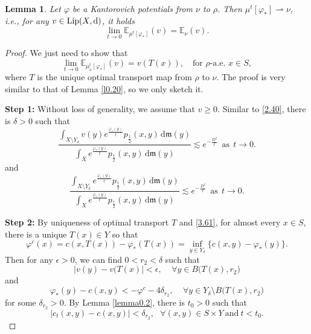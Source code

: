 \documentclass[a4paper,11pt]{article}
\numberwithin{equation}{section}
\theoremstyle{plain}
\newtheorem{lemma}[theorem]{Lemma}
\theoremstyle{definition}
\theoremstyle{remark}
\newcommand{\mm}{\mathfrak m}
\newcommand{\E}{\mathbb{E}}
\newcommand{\Lip}{\mathop{\rm Lip}\nolimits}
\renewcommand{\d}{{\mathrm d}}
\newcommand{\weakto}{\rightharpoonup}
\begin{document}
	\begin{lemma}\label{l0.21}
		Let $\varphi$ be a Kantorovich potentials from $\nu$ to $\rho$.   Then $\mu^t[\varphi_{*}]\weakto \nu$,   i.e.,  for any  $v\in\Lip(X,\d)$, it holds
		\begin{equation}
			\lim_{t\rightarrow0}\E_{\mu^t[\varphi_{*}]}(v)=\E_\nu(v).
		\end{equation}
	\end{lemma}
     \begin{proof}
     		We just need to show that 
     	\begin{equation}\label{0.38}
     		\lim_{t\rightarrow0}\E_{\mu_x^t[\varphi_{*}]}(v)=v(T(x)),\quad\text{for $\rho$-a.e. $x\in S$},
     	\end{equation}
     	where $T$ is the unique optimal transport map from $\rho$ to $\nu$.  The proof is very similar to that of Lemma \ref{l0.20}, so we only sketch it.
          \medskip
          
     	{\bf Step 1:}   Without loss of generality,  we assume that $v\geq 0$.  Similar to \eqref{2.40},  there is $\delta>0$ such that 
     	\begin{equation}\label{ext1}
     	\frac{\int_{X\setminus Y_\delta} v(y) e^{\frac{\varphi_*(y)}{t}}p_\frac{t}{2}(x,y)\,\d\mm(y)}{\int_X e^{\frac{\varphi_*(y)}{t}}p_\frac{t}{2}(x,y)\,\d\mm(y)}\lesssim  e^{-\frac{D^2}{t}} ~~\text{as}~~t\to 0.
     	\end{equation}
     	and
     	\begin{equation}\label{2.53}
     	\frac{\int_{X\setminus Y_\delta} e^{\frac{\varphi_*(y)}{t}}p_\frac{t}{2}(x,y)\,\d\mm(y)}{\int_X e^{\frac{\varphi_*(y)}{t}}p_\frac{t}{2}(x,y)\,\d\mm(y)}\lesssim  e^{-\frac{D^2}{t}} ~~\text{as}~~t\to 0.
     	\end{equation}
     	
     
     	{\bf Step 2:} By uniqueness of optimal transport $T$ and \eqref{3.61}, for almost every $x\in S$,  there is a unique $T(x)\in Y$ so that $$\varphi^c(x)=c(x, T(x))-\varphi_*(T(x))=\inf_{y\in Y_\delta}\big\{c(x,y)-\varphi_{*}(y)\big\}.$$
    Then 	 for any $\epsilon>0$,   we can find
     	$0<r_2<\delta$ such that 
     	\begin{equation}\label{T}
     	|v(y)-v(T(x)| <\epsilon,~~~~~\forall y \in B\big(T(x),  r_2\big)
     	\end{equation}
     	and
     \begin{equation}\label{r1r2}
     	\varphi_*(y)-c(x,y)<-\varphi^c-4\delta_{r_2},~~~~~\forall y \in Y_\delta\setminus B\big(T(x),  r_2\big)
     	\end{equation}
     for some $	\delta_{r_2}>0$.
By Lemma \ref{lemma0.2},   there is  $t_0>0$ such that 
		$$|c_t(x,y)-c(x,y)|<\delta_{r_2},~~~\forall (x, y)\in S\times Y~\text{and}~ t<t_0.$$
		

\end{proof}
\end{document}
